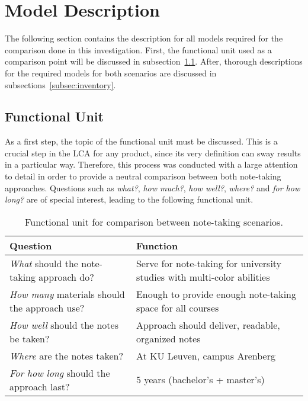 \section{Model Description}\label{sec:model_description}
The following section contains the description for all models required for the comparison done in this investigation. First, the functional unit used as a comparison point will be discussed in subsection~\ref{subsec:functional_unit}. After, thorough descriptions for the required models for both scenarios are discussed in subsections~\ref{subsec:inventory}.


\subsection{Functional Unit}\label{subsec:functional_unit}
As a first step, the topic of the functional unit must be discussed. This is a crucial step in the LCA for any product, since its very definition can sway results in a particular way. Therefore, this process was conducted with a large attention to detail in order to provide a neutral comparison between both note-taking approaches. Questions such as \textit{what?}, \textit{how much?}, \textit{how well?}, \textit{where?} and \textit{for how long?} are of special interest, leading to the following functional unit.

\renewcommand{\arraystretch}{1.5}
\begin{table}[H]
    \centering
    \begin{tabular}{M{0.4\textwidth}|M{0.5\textwidth}}
        Question & Function \\
        \hline
        \hline
        \textit{What} should the note-taking approach do?            &   Serve for note-taking for university studies with multi-color abilities\\
        \hline
        \textit{How many} materials should the approach use?         &   Enough to provide enough note-taking space for all courses\\
        \hline
        \textit{How well} should the notes be taken?                 &   Approach should deliver, readable, organized notes\\
        \hline
        \textit{Where} are the notes taken?                          &   At KU Leuven, campus Arenberg\\
        \hline
        \textit{For how long} should the approach last?              &   5 years (bachelor's + master's)
    \end{tabular}
    \caption{Functional unit for comparison between note-taking scenarios.}
    \label{tab:functional_unit}
\end{table}
\renewcommand{\arraystretch}{1}

